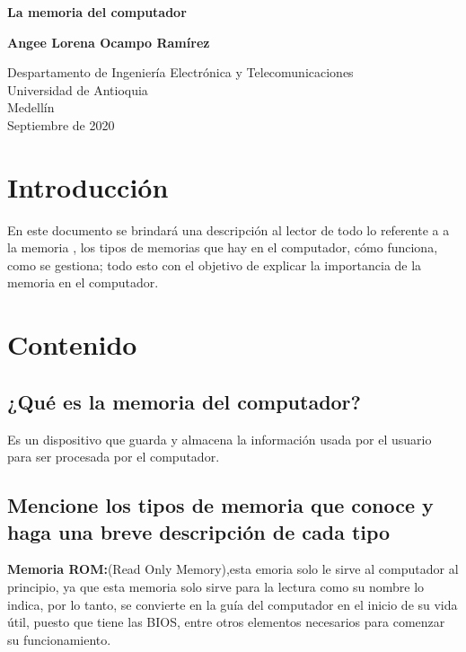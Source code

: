 \documentclass{article}
\begin{document}
\begin{titlepage}
    \begin{center}
        \vspace*{1cm}
            
        \Huge
        \textbf{La memoria del computador}\par
        \vspace{0.5cm}
        \LARGE
        \vspace{1.5cm}
            
        \textbf{Angee Lorena Ocampo Ramírez}
            
        \vfill
            
        \vspace{0.8cm}
            
        \Large
        Despartamento de Ingeniería Electrónica y Telecomunicaciones\\
        Universidad de Antioquia\\
        Medellín\\
        Septiembre de 2020
            
    \end{center}
\end{titlepage}

\tableofcontents\newpage

\section{Introducción}
En este documento se brindará una descripción al lector de todo lo referente a a la memoria , los tipos de memorias que hay en el computador, cómo funciona, como se gestiona; todo esto con el objetivo de explicar la importancia de la memoria en el computador.\par

\section{Contenido} \label{contenido}
\subsection{¿Qué es la memoria del computador?}\par
Es un dispositivo que guarda y almacena la información usada por el usuario para ser procesada por el computador.
\subsection{Mencione los tipos de memoria que conoce y haga una breve descripción de cada tipo}\par
\textbf{Memoria ROM:}(Read Only Memory),esta emoria solo le sirve al computador al principio, ya que esta memoria solo sirve para la lectura como su nombre lo indica, por lo tanto, se convierte en la guía del computador en el inicio de su vida útil, puesto que tiene las BIOS, entre otros elementos necesarios para comenzar su funcionamiento.\par
\end{document}
